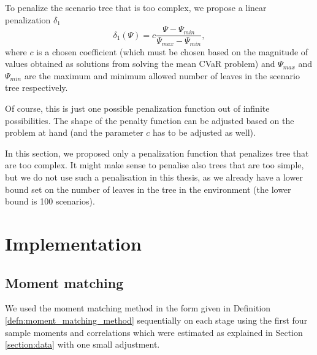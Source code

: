 To penalize the scenario tree that is too complex, we propose a linear penalization $\delta_1$
\begin{equation*}
\delta_1(\Psi) = c \frac{\Psi - \Psi_{min}}{\Psi_{max} - \Psi_{min}},
\end{equation*}
where $c$ is a chosen coefficient (which must be chosen based on the magnitude of values obtained as solutions from solving the mean CVaR problem) and $\Psi_{max}$ and $\Psi_{min}$ are the maximum and minimum allowed number of leaves in the scenario tree respectively.



Of course, this is just one possible penalization function out of infinite possibilities. The shape of the penalty function can be adjusted based on the problem at hand (and the parameter $c$ has to be adjusted as well).

In this section, we proposed only a penalization function that penalizes tree that are too complex. It might make sense to penalise also trees that are too simple, but we do not use such a penalisation in this thesis, as we already have a lower bound set on the number of leaves in the tree in the environment (the lower bound is 100 scenarios).

\section{Implementation}
\subsection{Moment matching}
\label{subsection:moment_matching}
We used the moment matching method in the form given in Definition \ref{defn:moment_matching_method} sequentially on each stage using the first four sample moments and correlations which were estimated as explained in Section \ref{section:data} with one small adjustment. 

